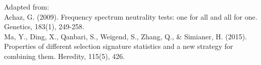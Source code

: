 \documentclass[12pt,a4paper]{paper}
\begin{document}
\textsf{Adapted from:}\\Achaz, G. (2009). Frequency spectrum neutrality tests: one for all and all for one. Genetics, 183(1), 249-258.\\
Ma, Y., Ding, X., Qanbari, S., Weigend, S., Zhang, Q., \& Simianer, H. (2015). Properties of different selection signature statistics and a new strategy for combining them. Heredity, 115(5), 426.
\end{document}
